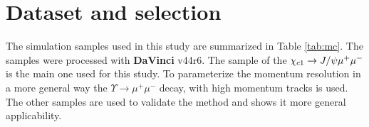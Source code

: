 \section{Dataset and selection}
\label{sec:dataset}
 The simulation samples used in this study are summarized in Table
 \ref{tab:mc}. The samples were processed with \textbf{DaVinci}
 v44r6. The sample of the ${\chi_{{c} 1}}
 \rightarrow J/\psi \mu^+ \mu^-$ is the main one used for this
 study. To parameterize  the momentum resolution in a more general way
 the $\Upsilon  \rightarrow \mu^+ \mu^-$ decay, with high momentum
 tracks is used. The other samples are used to validate the method and
 shows it more general applicability. 

\begin{table}[htb!]
\caption{\small Simulated data samples used in this study. }
\small
\begin{center}
\end{center}
\end{table}
